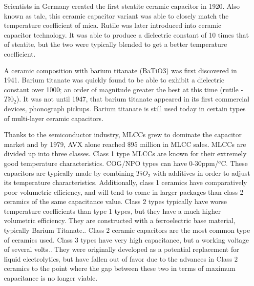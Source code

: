 Scientists in Germany created the first steatite ceramic capacitor in 1920.\cite[Ch 3 Sec II]{cerMaterials}\cite{cerDie} Also known as talc, this ceramic capacitor variant was able to closely match the temperature coefficient of mica.\cite{steatite_hf} Rutile was later introduced into ceramic capacitor technology. It was able to produce a dielectric constant of 10 times that of steatite, but the two were typically blended to get a better temperature coefficient. 

A ceramic composition with barium titanate (BaTiO3) was first discovered in 1941. Barium titanate was quickly found to be able to exhibit a dielectric constant over 1000; an order of magnitude greater the best at this time (rutile - $Ti0_2$). It was not until 1947, that barium titanate appeared in its first commercial devices, phonograph pickups.\cite{piezCer}\cite{hist_cerFilt}\cite[Ch 3 Sec III]{cerMaterials} Barium titanate is still used today in certain types of multi-layer ceramic capacitors.

Thanks to the semiconductor industry, MLCCs grew to dominate the capacitor market and by 1979, AVX alone reached $\$95$ million in MLCC sales.\cite{avx_hist}
MLCCs are divided up into three classes. Class 1 type MLCCs are known for their extremely good temperature characteristics. COG/NPO types can have 0-30ppm/$^o$C. These capacitors are typically made by combining $TiO_2$ with additives in order to adjust its temperature characteristics\cite{intro_cerCaps}. Additionally, class 1 ceramics have comparatively poor volumetric efficiency, and will tend to come in larger packages than class 2 ceramics of the same capacitance value. Class 2 types typically have worse temperature coefficients than type 1 types, but they have a much higher volumetric efficiency. They are constructed with a ferroelectric base material, typically Barium Titanate.\cite{intro_cerCaps}. Class 2 ceramic capacitors are the most common type of ceramics used. Class 3 types have very high capacitance, but a working voltage of several volts.\cite{hist_cerFilt}\cite[Ch 3 Sec VI]{cerMaterials}\cite{atCer_tempco}. They were originally developed as a potential replacement for liquid electrolytics, but have fallen out of favor due to the advances in Class 2 ceramics to the point where the gap between these two in terms of maximum capacitance is no longer viable\cite{wiki_cer}.

